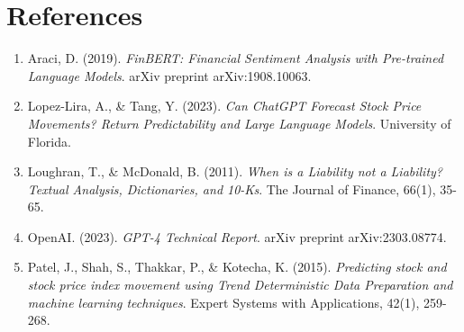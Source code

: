 \section{References}

\begin{enumerate}
    \item Araci, D. (2019). \textit{FinBERT: Financial Sentiment Analysis with Pre-trained Language Models}. arXiv preprint arXiv:1908.10063.
    \item Lopez-Lira, A., \& Tang, Y. (2023). \textit{Can ChatGPT Forecast Stock Price Movements? Return Predictability and Large Language Models}. University of Florida.
    \item Loughran, T., \& McDonald, B. (2011). \textit{When is a Liability not a Liability? Textual Analysis, Dictionaries, and 10-Ks}. The Journal of Finance, 66(1), 35-65.
    \item OpenAI. (2023). \textit{GPT-4 Technical Report}. arXiv preprint arXiv:2303.08774.
    \item Patel, J., Shah, S., Thakkar, P., \& Kotecha, K. (2015). \textit{Predicting stock and stock price index movement using Trend Deterministic Data Preparation and machine learning techniques}. Expert Systems with Applications, 42(1), 259-268.
\end{enumerate}
